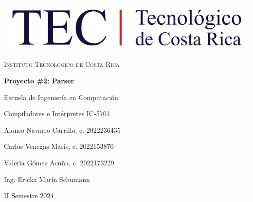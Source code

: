 \documentclass[a4paper,12pt]{article}
\begin{document}
\begin{titlepage}
    \centering
    \vspace*{0.5cm}

    \includegraphics[width=1\textwidth]{logo-tec.png}\par\vspace{1cm}

    {\scshape Instituto Tecnológico de Costa Rica\par}
    \vspace{2cm}

    {\Huge\bfseries Proyecto \#2: Parser\par}
    \vspace{2cm}

    {\large Escuela de Ingeniería en Computación\par}

    {\large Compiladores e Intérpretes IC-5701\par}
    \vspace{2cm}

    {\large Alonso Navarro Carrillo, c. 2022236435\par}
    \vspace{0.25cm}
    {\large Carlos Venegas Masis, c. 2022153870 \par}
    \vspace{0.25cm}
    {\large Valeria Gómez Acuña, c. 2022173229 \par}
    \vspace{2cm}

    \vfill

    {\large Ing. Ericka Marín Schumann\par}

    {II Semestre 2024\par}
\end{titlepage}

\tableofcontents\newpage

\end{document}
